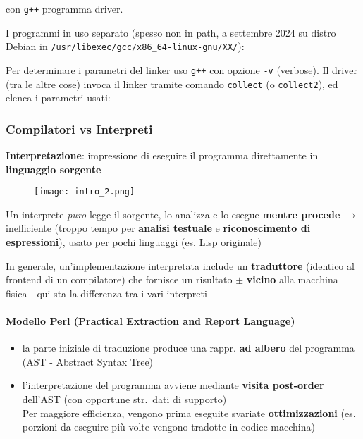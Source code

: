 \noindent con \lstinline|g++| programma driver.

I programmi in uso separato (spesso non in path, a settembre 2024 su distro Debian in \lstinline|/usr/libexec/gcc/x86_64-linux-gnu/XX/|):

Per determinare i parametri del linker uso \lstinline|g++| con opzione \lstinline|-v| (verbose). Il driver (tra le altre cose) invoca il linker tramite comando \lstinline|collect| (o \lstinline|collect2|), ed elenca i parametri usati:


\subsubsection{Compilatori vs Interpreti}

\textbf{Interpretazione}: impressione di eseguire il programma direttamente in \textbf{linguaggio sorgente}

\begin{figure}[h]
  \centering
  \texttt{[image: intro\_2.png]}
\end{figure}


Un interprete \textit{puro} legge il sorgente, lo analizza e lo esegue \textbf{mentre procede} $\rightarrow$ inefficiente (troppo tempo per \textbf{analisi testuale} e \textbf{riconoscimento di espressioni}), usato per pochi linguaggi (es. Lisp originale)

In generale, un'implementazione interpretata include un \textbf{traduttore} (identico al frontend di un compilatore) che fornisce un risultato $\pm$ \textbf{vicino} alla macchina fisica - qui sta la differenza tra i vari interpreti

\paragraph{Modello Perl (Practical Extraction and Report Language)}

\begin{itemize}
  \item la parte iniziale di traduzione produce una rappr. \textbf{ad albero} del programma (AST - Abstract Syntax Tree)
  \item l'interpretazione del programma avviene mediante \textbf{visita post-order} dell'AST (con opportune str.~dati di supporto)\\
  Per maggiore efficienza, vengono prima eseguite svariate \textbf{ottimizzazioni} (es. porzioni da eseguire pi\`u volte vengono tradotte in codice macchina)
\end{itemize}

